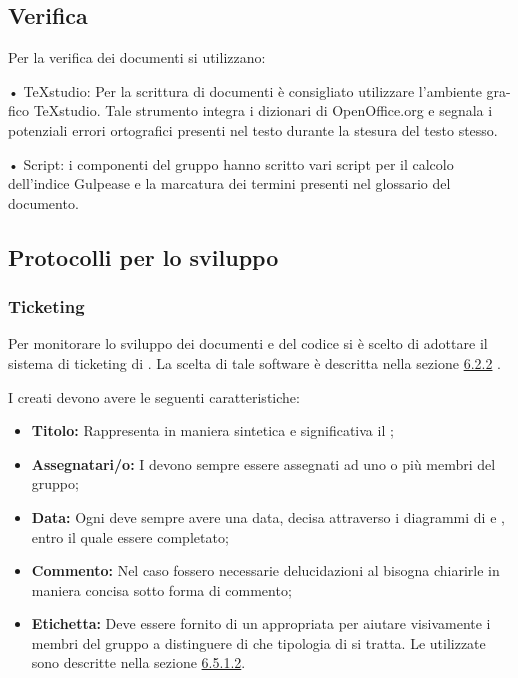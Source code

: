 \documentclass[12pt,a4paper]{article}
\begin{document}
\subsection{Verifica}
Per la verifica dei documenti si utilizzano:

• TeXstudio: Per la scrittura di documenti è consigliato utilizzare l’ambiente gra-
fico TeXstudio. Tale strumento integra i dizionari di OpenOffice.org e segnala i
potenziali errori ortografici presenti nel testo durante la stesura del testo stesso.

• Script: i componenti del gruppo hanno scritto vari script per il calcolo dell’indice
Gulpease e la marcatura dei termini presenti nel glossario del documento.



\subsection{Protocolli per lo sviluppo}

\subsubsection{Ticketing}\label{ticket} %
Per monitorare lo sviluppo dei documenti e del codice si è scelto di adottare il sistema di ticketing di \textit{}. La scelta di tale software è descritta nella sezione \hyperref[swGestioneProgetto]{6.2.2} .

\label{ticketStruttura}
I \textit{} creati devono avere le seguenti caratteristiche:
\begin{itemize}
	\item \textbf{Titolo:} Rappresenta in maniera sintetica e significativa il \textit{};
	\item \textbf{Assegnatari/o:} I \textit{} devono sempre essere assegnati ad uno o più membri del gruppo;
	\item \textbf{Data:} Ogni \textit{} deve sempre avere una data, decisa attraverso i diagrammi di  e , entro il quale essere completato;
	\item \textbf{Commento:} Nel caso fossero necessarie delucidazioni al \textit{} bisogna chiarirle in maniera concisa sotto forma di commento;
	\item \textbf{Etichetta:} Deve essere fornito di un appropriata  per aiutare visivamente i membri del gruppo a distinguere di che tipologia di \textit{} si tratta. 
	Le  utilizzate sono descritte nella sezione  \hyperref[ticketEtichette]{6.5.1.2}.
\end{itemize}
\end{document}
